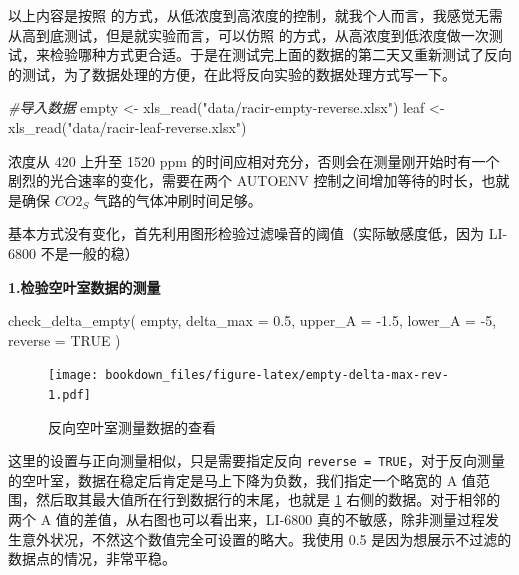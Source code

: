 \documentclass[
]{krantz}
\makeatletter
\newenvironment{Shaded}{\begin{snugshade}}{\end{snugshade}}
\newcommand{\AttributeTok}[1]{\textcolor[rgb]{0.77,0.63,0.00}{#1}}
\newcommand{\CommentTok}[1]{\textcolor[rgb]{0.56,0.35,0.01}{\textit{#1}}}
\newcommand{\ConstantTok}[1]{\textcolor[rgb]{0.00,0.00,0.00}{#1}}
\newcommand{\DecValTok}[1]{\textcolor[rgb]{0.00,0.00,0.81}{#1}}
\newcommand{\FloatTok}[1]{\textcolor[rgb]{0.00,0.00,0.81}{#1}}
\newcommand{\FunctionTok}[1]{\textcolor[rgb]{0.00,0.00,0.00}{#1}}
\newcommand{\NormalTok}[1]{#1}
\newcommand{\OtherTok}[1]{\textcolor[rgb]{0.56,0.35,0.01}{#1}}
\newcommand{\SpecialCharTok}[1]{\textcolor[rgb]{0.00,0.00,0.00}{#1}}
\newcommand{\StringTok}[1]{\textcolor[rgb]{0.31,0.60,0.02}{#1}}
\newenvironment{kframe}{%
\medskip{}
\setlength{\fboxsep}{.8em}
 \def\at@end@of@kframe{}%
 \ifinner\ifhmode%
  \def\at@end@of@kframe{\end{minipage}}%
  \begin{minipage}{\columnwidth}%
 \fi\fi%
 \def\FrameCommand##1{\hskip\@totalleftmargin \hskip-\fboxsep
 \colorbox{shadecolor}{##1}\hskip-\fboxsep
     \hskip-\linewidth \hskip-\@totalleftmargin \hskip\columnwidth}%
 \MakeFramed {\advance\hsize-\width
   \@totalleftmargin\z@ \linewidth\hsize
   \@setminipage}}%
 {\par\unskip\endMakeFramed%
 \at@end@of@kframe}
\renewenvironment{Shaded}{\begin{kframe}}{\end{kframe}}
\makeatother
\begin{document}
以上内容是按照 \citet{Coursolle12019} 的方式，从低浓度到高浓度的控制，就我个人而言，我感觉无需从高到底测试，但是就实验而言，可以仿照 \citet{Coursolle12019} 的方式，从高浓度到低浓度做一次测试，来检验哪种方式更合适。于是在测试完上面的数据的第二天又重新测试了反向的测试，为了数据处理的方便，在此将反向实验的数据处理方式写一下。

\begin{Shaded}
\begin{Highlighting}[]
\CommentTok{\#导入数据}
\NormalTok{empty }\OtherTok{\textless{}{-}} \FunctionTok{xls\_read}\NormalTok{(}\StringTok{"data/racir{-}empty{-}reverse.xlsx"}\NormalTok{)}
\NormalTok{leaf }\OtherTok{\textless{}{-}} \FunctionTok{xls\_read}\NormalTok{(}\StringTok{"data/racir{-}leaf{-}reverse.xlsx"}\NormalTok{)}
\end{Highlighting}
\end{Shaded}

浓度从 420 上升至 1520 ppm 的时间应相对充分，否则会在测量刚开始时有一个剧烈的光合速率的变化，需要在两个 AUTOENV 控制之间增加等待的时长，也就是确保 \(CO2_S\) 气路的气体冲刷时间足够。

基本方式没有变化，首先利用图形检验过滤噪音的阈值（实际敏感度低，因为 LI-6800 不是一般的稳）

\textbf{1.检验空叶室数据的测量}

\begin{Shaded}
\begin{Highlighting}[]
\FunctionTok{check\_delta\_empty}\NormalTok{(}
\NormalTok{  empty,}
  \AttributeTok{delta\_max =} \FloatTok{0.5}\NormalTok{,}
  \AttributeTok{upper\_A =} \SpecialCharTok{{-}}\FloatTok{1.5}\NormalTok{,}
  \AttributeTok{lower\_A =} \SpecialCharTok{{-}}\DecValTok{5}\NormalTok{,}
  \AttributeTok{reverse =} \ConstantTok{TRUE}
\NormalTok{)}
\end{Highlighting}
\end{Shaded}

\begin{figure}
\centering
\texttt{[image: bookdown\_files/figure-latex/empty-delta-max-rev-1.pdf]}
\caption{\label{fig:empty-delta-max-rev}反向空叶室测量数据的查看}
\end{figure}

这里的设置与正向测量相似，只是需要指定反向 \texttt{reverse\ =\ TRUE}，对于反向测量的空叶室，数据在稳定后肯定是马上下降为负数，我们指定一个略宽的 A 值范围，然后取其最大值所在行到数据行的末尾，也就是 \ref{fig:empty-delta-max-rev} 右侧的数据。对于相邻的两个 A 值的差值，从右图也可以看出来，LI-6800 真的不敏感，除非测量过程发生意外状况，不然这个数值完全可设置的略大。我使用 0.5 是因为想展示不过滤的数据点的情况，非常平稳。
\end{document}
